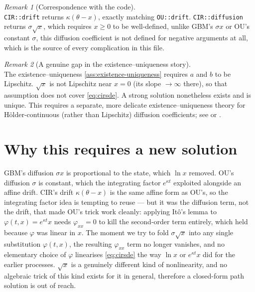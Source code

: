 \documentclass[11pt]{report}
\newcommand{\drift}{a}
\newcommand{\diff}{b}
\theoremstyle{plain}
\theoremstyle{definition}
\theoremstyle{remark}
\newtheorem{remark}{Remark}[chapter]
\numberwithin{equation}{chapter}
\begin{document}
\begin{remark}[Correspondence with the code]
  \leavevmode\\
\texttt{CIR::drift} returns $\kappa(\theta-x)$, exactly matching
\texttt{OU::drift}. \texttt{CIR::diffusion} returns $\sigma\sqrt{x}$,
which requires $x\ge0$ to be well-defined, unlike GBM's $\sigma x$
or OU's constant $\sigma$, this diffusion coefficient is not defined
for negative arguments at all, which is the source of every
complication in this file.
\end{remark}

\begin{remark}[A genuine gap in the existence--uniqueness story]
  \leavevmode\\
The existence--uniqueness \cref{ass:existence-uniqueness}
requires $\drift$ and $\diff$ to be Lipschitz. $\sqrt{x}$ is
not Lipschitz near $x=0$ (its slope $\to\infty$ there), so
that assumption does not cover \eqref{eq:cirsde}.
A strong solution nonetheless exists and is unique. This requires a
separate, more delicate existence--uniqueness theory for
H\"older-continuous (rather than Lipschitz) diffusion coefficients;
see  or .
\end{remark}

\section{Why this requires a new solution}

GBM's diffusion $\sigma x$ is proportional to the state, which
$\ln x$ removed. OU's diffusion $\sigma$ is constant, which the
integrating factor $e^{\kappa t}$ exploited alongside an affine drift.
CIR's drift $\kappa(\theta-x)$ is the same affine form as OU's, so the
integrating factor idea is tempting to reuse --- but it was the
diffusion term, not the drift, that made OU's trick work cleanly:
applying It\^o's lemma to $\varphi(t,x)=e^{\kappa t}x$ needs $\varphi_{xx}=0$ to
kill the second-order term entirely, which held because $\varphi$ was
linear in $x$. The moment we try to fold $\sigma\sqrt{x}$ into
any single substitution $\varphi(t,x)$, the resulting $\varphi_{xx}$ term no
longer vanishes, and no elementary choice of $\varphi$ linearises
\eqref{eq:cirsde} the way $\ln x$ or $e^{\kappa t}x$ did for the
earlier processes. $\sqrt{x}$ is a
genuinely different kind of nonlinearity, and no algebraic trick of this kind exists for
it in general, therefore a closed-form path solution is out of reach.
\end{document}
